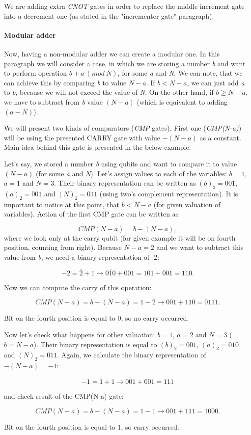 We are adding extra \textit{CNOT} gates in order to replace the middle increment gate into a decrement one (as stated in the "incrementer gate" paragraph).

\paragraph{Modular adder\\}

Now, having a non-modular adder we can create a modular one. In this paragraph we will consider a case, in which we are storing a number \textit{b} and want to perform operation $b + a\ (mod\ N)$, for some \textit{a} and \textit{N}. We can note, that we can achieve this by comparing \textit{b} to value $N - a$. If $b < N - a$, we can just add \textit{a} to \textit{b}, because we will not exceed the value of \textit{N}. On the other hand, if $b \geq N - a$, we have to subtract from \textit{b} value $(N - a)$ (which is equivalent to adding $(a - N)$). 

We will present two kinds of comparators (\textit{CMP} gates). First one (\textit{CMP(N-a)}) will be using the presented CARRY gate with value $-(N - a)$ as a constant. Main idea behind this gate is presented in the below example.

\begin{example}
Let's say, we stored a number \textit{b} using qubits and want to compare it to value $(N - a)$ (for some \textit{a} and \textit{N}). Let's assign values to each of the variables: $b = 1$, $a = 1$ and $N = 3$. Their binary representation can be written as $(b)_2 = 001$, $(a)_2 = 001$ and $(N)_2 = 011$ (using two's complement representation). It is important to notice at this point, that $b < N - a$ (for given valuation of variables). Action of the first CMP gate can be written as

\[ CMP(N-a) = b - (N - a),\]
where we look only at the carry qubit (for given example it will be on fourth position, counting from right). Because $N - a = 2$ and we want to subtract this value from \textit{b}, we need a binary representation of -2:

\[ -2 = \overline{2} + 1 \rightarrow \overline{010} + 001 = 101 + 001 = 110.\]

Now we can compute the carry of this operation:

\[ CMP(N - a) = b - (N - a) = 1 - 2 \rightarrow 001 + 110 = 0111.\]

Bit on the fourth position is equal to 0, so no carry occurred.

Now let's check what happens for other valuation: $b = 1$, $a = 2$ and $N = 3$ ($b = N - a$). Their binary representation is equal to $(b)_2 = 001$, $(a)_2 = 010$ and $(N)_2 = 011$. Again, we calculate the binary representation of $-(N - a) = -1$:

\[ -1 = \overline{1} + 1 \rightarrow \overline{001} + 001 = 111\]

and check result of the CMP(N-a) gate:

\[ CMP(N - a) = b - (N - a) = 1 - 1 \rightarrow 001 + 111 = 1000.\]

Bit on the fourth position is equal to 1, so carry occurred.
\end{example}

